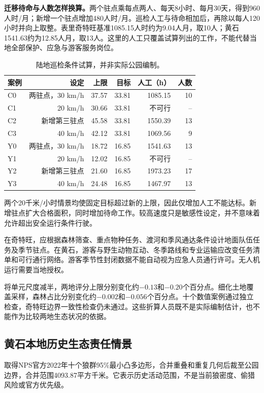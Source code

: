 \documentclass[12pt,a4paper]{article}
\numberwithin{equation}{section}
\begin{document}
\noindent\textbf{迁移待命与人数怎样换算。}两个驻点乘每点两人、每天8小时、每月30天，得到960人时/月；新增一个驻点增加480人时/月。巡检人工与待命相加后，再除以每人120小时并向上取整。表里奇特旺基准1085.15人时约为9.04人月，取10人；黄石1541.63约为12.85人月，取13人。这里的人工只覆盖试算列出的工作，不能代替当地全部保护、应急与游客服务岗位。


\begin{table}[H]
\centering\normalsize
\caption{陆地巡检条件试算，并非实际公园编制。}
\label{tab:transfercases}
\begin{tabular}{lrrrrr}
\toprule
案例 & 设定 & 上限 & 目标 & 人工（h） & 人数 \\
\midrule
C0 & 两驻点，30 km/h & 37.57 & 33.81 & 1085.15 & 10 \\
C1 & 20 km/h & 30.66 & 33.81 & 不可行 & -- \\
C2 & 新增第三驻点 & 45.58 & 33.81 & 1550.39 & 13 \\
C3 & 40 km/h & 42.12 & 33.81 & 1069.56 & 9 \\
Y0 & 两驻点，30 km/h & 18.72 & 16.85 & 1541.63 & 13 \\
Y1 & 20 km/h & 12.02 & 16.85 & 不可行 & -- \\
Y2 & 新增第三驻点 & 21.60 & 16.85 & 1973.23 & 17 \\
Y3 & 40 km/h & 24.48 & 16.85 & 1467.97 & 13 \\
\bottomrule
\end{tabular}
\end{table}

两个20千米/小时情景均使固定目标超过新的上限，因此仅增加人工不能达标。新增驻点扩大合格面积，同时增加待命工作。较高速度只是敏感性设定，并不意味着允许超出安全运行条件行驶。

在奇特旺，应根据森林筛查、重点物种任务、渡河和季风通达条件设计地面队伍任务及季节驻点。在黄石，游客与野生动物互动、冬季路线和专业运输应改变任务清单和可行通行网络。游客季节性封闭数据不能自动视为应急人员通行许可。无人机运行需要当地授权。

将单元尺度减半，两地评分上限分别变化约$-0.13$和$-0.20$个百分点。细化土地覆盖采样，森林占比分别变化约$-0.002$和$-0.056$个百分点。十个数值案例通过独立检查，奇特旺边界一致性检查仍未通过。这些折算人员既不是实际编制估计，也不能作为比较两地生态状况的依据。
\subsection{黄石本地历史生态责任情景}
取得NPS官方2022年十个狼群95\%最小凸多边形，合并重叠和重复几何后裁至公园边界，合并范围4093.87平方千米。它表示历史活动范围，不是当前狼密度、偷猎风险或官方优先级。
\end{document}
